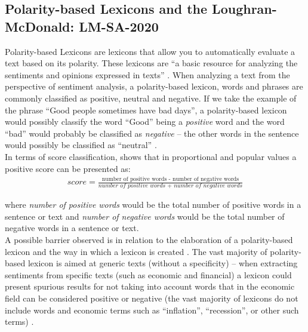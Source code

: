 \subsection{Polarity-based Lexicons and the Loughran-McDonald: LM-SA-2020} \label{subsec:polbas}

Polarity-based Lexicons are lexicons that allow you to automatically evaluate a text based on its polarity. These lexicons are ``a basic resource for analyzing the sentiments and opinions expressed in texts'' \cite[p.938]{san2016polarity}. When analyzing a text from the perspective of sentiment analysis, a polarity-based lexicon, words and phrases are commonly classified as positive, neutral and negative. If we take the example of the phrase ``Good people sometimes have bad days'', a polarity-based lexicon would possibly classify the word ``Good'' being a \textit{positive} word and the word ``bad'' would probably be classified as \textit{negative} -- the other words in the sentence would possibly be classified as ``neutral'' \cite[]{BCDG07}.\\

In terms of score classification, \cite{BCDG07} shows that in proportional and popular values a positive score can be presented as:
\begin{align*}
score = \frac{\text{number of positive words - number of negative words}}{\textit{number of positive words + number of negative words}}
\end{align*}

where \textit{number of positive words} would be the total number of positive words in a sentence or text and \textit{number of negative words} would be the total number of negative words in a sentence or text.\\

A possible barrier observed is in relation to the elaboration of a polarity-based lexicon and the way in which a lexicon is created \cite[]{stone1966general}. The vast majority of polarity-based lexicon is aimed at generic texts (without a specificity) -- when extracting sentiments from specific texts (such as economic and financial) a lexicon could present spurious results for not taking into account words that in the economic field can be considered positive or negative (the vast majority of lexicons do not include words and economic terms such as ``inflation'', ``recession'', or other such terms) \cite[]{loughran2011liability}.\\

